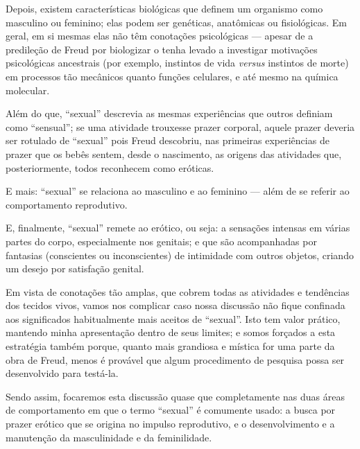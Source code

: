 Depois, existem características biológicas que definem um organismo
como masculino ou feminino; elas podem ser genéticas, anatômicas ou
fisiológicas. Em geral, em si mesmas elas não têm conotações
psicológicas --- apesar de a predileção de Freud por biologizar o tenha
levado a investigar motivações psicológicas ancestrais (por exemplo,
instintos\idxfreudinsti{} de vida \textit{versus} instintos de morte) em processos tão
mecânicos quanto funções celulares, e até mesmo na química molecular.

 Além do que, ``sexual'' descrevia as mesmas experiências que outros definiam como ``sensual''; se uma atividade trouxesse prazer\idxpraz{} corporal, aquele prazer deveria ser rotulado de ``sexual'' pois Freud descobriu, nas primeiras \mbox{experiências} de prazer que os bebês sentem, desde o nascimento, as origens das atividades que, posteriormente, todos reconhecem como eróticas.

 E mais: ``sexual'' se relaciona ao masculino
e ao feminino --- além de se referir ao comportamento reprodutivo.

 E, finalmente, ``sexual'' remete ao erótico,
ou seja: a sensações intensas em várias partes do corpo, especialmente
nos genitais; e que são acompanhadas por fantasias (conscientes ou
inconscientes) de intimidade com outros objetos, criando um desejo por
satisfação genital.

 Em vista de conotações tão amplas, que cobrem todas as atividades e
tendências dos tecidos vivos, vamos nos complicar caso nossa discussão
não fique confinada aos significados habitualmente mais aceitos de
``sexual''. Isto tem valor prático, mantendo
minha apresentação dentro de seus limites; e somos forçados a esta
estratégia também porque, quanto mais grandiosa e mística for uma parte
da obra de Freud, menos é provável que algum procedimento de pesquisa
possa ser desenvolvido para testá-la.

 Sendo assim, focaremos esta discussão quase que completamente nas duas
áreas de comportamento em que o termo
``sexual'' é comumente usado: a busca por
prazer erótico que se origina no impulso reprodutivo, e o
desenvolvimento e a manutenção da masculinidade e da feminilidade.

